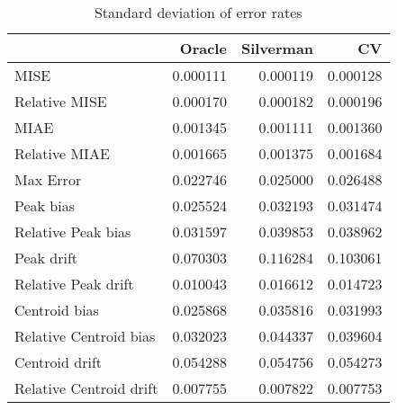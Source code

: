 \begin{table}[ht]
\centering
\begin{tabular}{lrrr}
  \hline
 & Oracle & Silverman & CV \\ 
  \hline
MISE & 0.000111 & 0.000119 & 0.000128 \\ 
  Relative MISE & 0.000170 & 0.000182 & 0.000196 \\ 
  MIAE & 0.001345 & 0.001111 & 0.001360 \\ 
  Relative MIAE & 0.001665 & 0.001375 & 0.001684 \\ 
  Max Error & 0.022746 & 0.025000 & 0.026488 \\ 
  Peak bias & 0.025524 & 0.032193 & 0.031474 \\ 
  Relative Peak bias & 0.031597 & 0.039853 & 0.038962 \\ 
  Peak drift & 0.070303 & 0.116284 & 0.103061 \\ 
  Relative Peak drift & 0.010043 & 0.016612 & 0.014723 \\ 
  Centroid bias & 0.025868 & 0.035816 & 0.031993 \\ 
  Relative Centroid bias & 0.032023 & 0.044337 & 0.039604 \\ 
  Centroid drift & 0.054288 & 0.054756 & 0.054273 \\ 
  Relative Centroid drift & 0.007755 & 0.007822 & 0.007753 \\ 
   \hline
\end{tabular}
\caption{Standard deviation of error rates} 
\label{tbl:stddev_error_rates}
\end{table}
